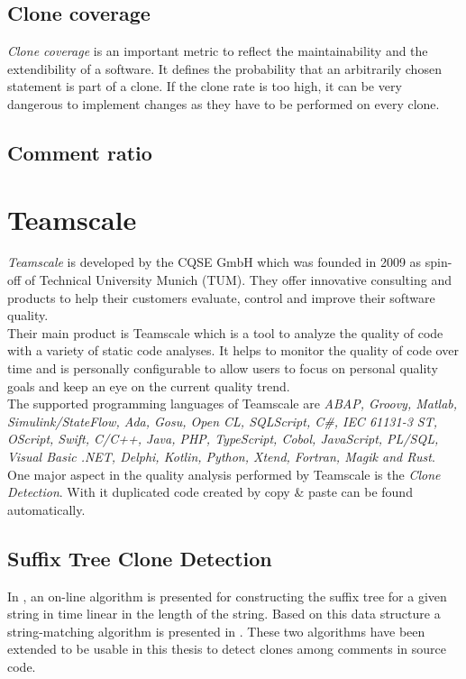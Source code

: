 \subsection{Clone coverage}
\textit{Clone coverage }is an important metric to reflect the maintainability
and the extendibility of a software. It defines the probability that an arbitrarily chosen statement is part of a clone. If the clone rate is too high, it can be very dangerous to implement changes as they have to be performed on every clone.
\subsection{Comment ratio}

\section{Teamscale}
\label{chapter_teamscale}
\textit{Teamscale} is developed by the CQSE GmbH which was founded in 2009 as spin-off of Technical University Munich (TUM). They offer innovative consulting and products to help their customers evaluate, control and improve their software quality. \\
Their main product is Teamscale which is a tool to analyze the quality of code with a variety of static code analyses. It helps to monitor the quality of code over time and is personally configurable to allow users to focus on personal quality goals and keep an eye on the current quality trend.\\
The supported programming languages of Teamscale are \textit{ABAP, Groovy, Matlab, Simulink/StateFlow, Ada, Gosu, Open CL, SQLScript, C\#, IEC 61131-3 ST, OScript, Swift, C/C++, Java, PHP, TypeScript, Cobol, JavaScript, PL/SQL, Visual Basic .NET, Delphi, Kotlin, Python, Xtend, Fortran, Magik and Rust}.\\
One major aspect in the quality analysis performed by Teamscale is the \textit{Clone Detection}. With it duplicated code created by copy \& paste can be found automatically.
\subsection{Suffix Tree Clone Detection}
In \cite{Ukkonen1995}, an on-line algorithm is presented for constructing the suffix tree for a given string in time linear in the length of the string. Based on this data structure a string-matching algorithm is presented in \cite{Ukkonen1993}. These two algorithms have been extended to be usable in this thesis to detect clones among comments in source code.
